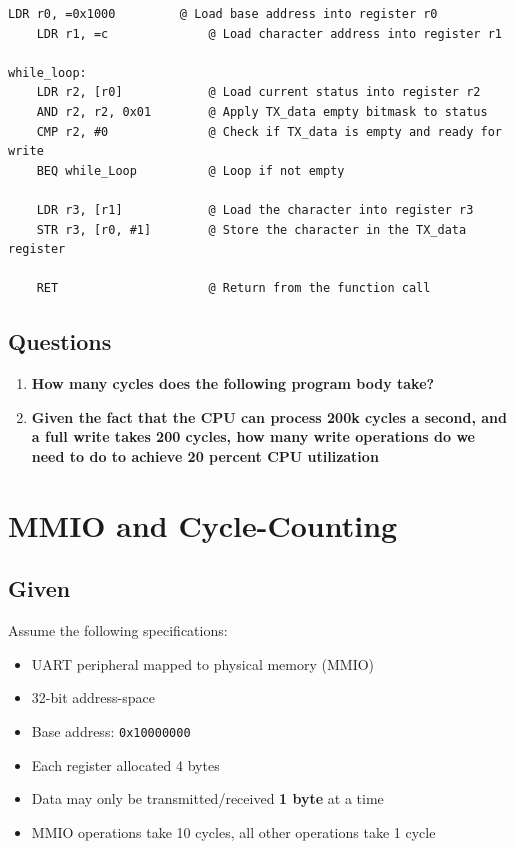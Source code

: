 \documentclass[14pt, a4paper]{article}
\begin{document}
\begin{lstlisting}[style=asmstyle]
    LDR r0, =0x1000         @ Load base address into register r0
    LDR r1, =c              @ Load character address into register r1

while_loop:
    LDR r2, [r0]            @ Load current status into register r2
    AND r2, r2, 0x01        @ Apply TX_data empty bitmask to status
    CMP r2, #0              @ Check if TX_data is empty and ready for write
    BEQ while_Loop          @ Loop if not empty

    LDR r3, [r1]            @ Load the character into register r3
    STR r3, [r0, #1]        @ Store the character in the TX_data register
    
    RET                     @ Return from the function call
\end{lstlisting}

\subsection*{Questions}

\begin{enumerate}

\item \textbf{How many cycles does the following program body take?}

\vspace{15mm}

\item \textbf{Given the fact that the CPU can process 200k cycles a second, and a full write takes 200 cycles, how many write operations do we
need to do to achieve 20 percent CPU utilization}

\vspace{15mm}

\end{enumerate}

\newpage

\section{MMIO and Cycle-Counting}

\subsection*{Given}

Assume the following specifications:

\begin{itemize}
    \item UART peripheral mapped to physical memory (MMIO)
    \item 32-bit address-space
    \item Base address: \texttt{0x10000000}
    \item Each register allocated 4 bytes
    \item Data may only be transmitted/received \textbf{1 byte} at a time
    \item MMIO operations take 10 cycles, all other operations take 1 cycle
\end{itemize}
\end{document}
